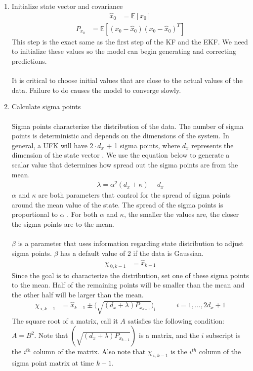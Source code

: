 \begin{enumerate}
    \item Initialize state vector and covariance
    \begin{align*}
        \hat{x}_{0} &= \mathbb{E}[x_{0}] 
       \end{align*}
        \begin{align*}
        P_{x_{0}} &= \mathbb{E}[(x_{0}-\hat{x}_{0})(x_{0}-\hat{x}_{0})^{T}] 
    \end{align*}
    This step is the exact same as the first step of the KF and the EKF. We need to initialize these values so the model can begin generating and correcting predictions. \\ \\
    It is critical to choose initial values that are close to the actual values of the data. Failure to do causes the model to converge slowly.
        \item Calculate sigma points \\ \\
        Sigma points characterize the distribution of the data. The number of sigma points is deterministic and depends on the dimensions of the system. In general, a UFK will have  $2 \cdot d_x$ + 1 sigma points, where $d_x$ represents the dimension of the state vector \cite{inbook, inproceedings, Wan01theunscented}.  We use the equation below to generate a scalar value that determines how spread out the sigma points are from the mean. 
         \begin{align*}
        \lambda = \alpha^{2}(d_{x}+\kappa)-d_{x} 
         \end{align*}
         $\alpha$ and $\kappa$ are both parameters that control for the spread of sigma points around the mean value of the state. The spread of the sigma points is proportional to $\alpha$ . For both $\alpha$ and $\kappa $,  the smaller the values are, the closer the sigma points are to the mean.\\ \\
       $\beta$ is a parameter that uses information regarding state distribution to adjust sigma points. $\beta$ has a default value of 2 if the data is Gaussian. 
    \begin{align*}
        \chi_{\ 0,k-1} &= \hat{x}_{k-1} 
     \end{align*}
             Since the goal is to characterize the distribution, set one of these sigma points to the mean. Half of the remaining points will be smaller than the mean and the other half will be larger than the mean.
     \begin{align*}
        \chi_{\ i,k-1} &= \hat{x}_{k-1} \pm \bigg(\sqrt{(d_{x}+\lambda )P_{x_{k-1}}}\bigg)_{i} \quad \quad \quad i=1,\dots,2 d_x + 1
        \end{align*}
        The square root of a matrix, call it $A$ satisfies the following condition: $A = B^2$. Note that $(\sqrt{(d_{x}+\lambda)P_{x_{k-1}}})$ is a matrix, and the $i$ subscript is the $i^{th}$ column of the matrix. Also note that $\chi_{\ i,k-1}$ is the $i^{th}$ column of the sigma point matrix at time $k-1$.
       


\end{enumerate}
